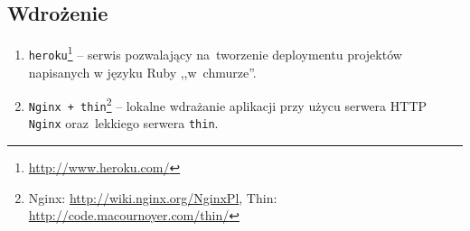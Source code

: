 \subsection{Wdrożenie}

\begin{enumerate}
  \item \texttt{heroku}\footnote{\url{http://www.heroku.com/}} -- serwis pozwalający na~tworzenie deploymentu projektów napisanych w języku Ruby ,,w~chmurze''.
  \item \texttt{Nginx + thin}\footnote{Nginx: \url{http://wiki.nginx.org/NginxPl}, Thin: \url{http://code.macournoyer.com/thin/}} -- lokalne wdrażanie aplikacji przy użycu serwera HTTP \texttt{Nginx} oraz~lekkiego serwera \texttt{thin}.
\end{enumerate}
